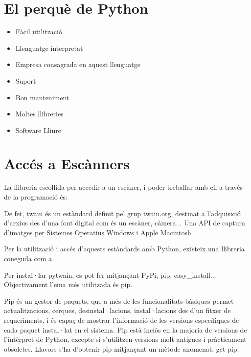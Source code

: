 \documentclass[letterpaper,11pt,catalan]{sphinxmanual}
\begin{document}
\section{El perquè de Python}
\label{\detokenize{index:el-perque-de-python}}\begin{itemize}
\item {} 
Fàcil utilització

\item {} 
Llenguatge interpretat

\item {} 
Empresa consagrada en aquest llenguatge

\item {} 
Suport

\item {} 
Bon manteniment

\item {} 
Moltes llibreries

\item {} 
Software Lliure

\end{itemize}


\section{Accés a Escànners}
\label{\detokenize{index:reference-twain}}\label{\detokenize{index:acces-a-escanners}}
La llibreria escollida per accedir a un escàner, i poder treballar
amb ell a través de la programació és: 

De fet, twain és un estàndard definit pel grup twain.org, destinat a l'adquisició
d'arxius des d'una font digital com és un escàner, càmera... Una API de captura
d'imatges per Sistemes Operatius Windows i Apple Macintosh.

Per la utilització i accés d'aquests estàndards amb Python, existeix una llibreria
coneguda com a 

Per instal·lar pytwain, es pot fer mitjançant PyPi, pip, easy\_install... Objectivament
l'eina més utilitzada és pip.

Pip és un gestor de paquets, que a més de les funcionalitats bàsiques permet actualitzacions,
cerques, desinstal·lacions, instal·lacions des d'un fitxer de requeriments, i és capaç de mostrar
l'informació de les versions específiques de cada paquet instal·lat en el sistema. Pip està inclòs
en la majoria de versions de l'intèrpret de Python, excepte si s'utilitzen versions molt antigues i pràcticament
obsoletes. Llavors s'ha d'obtenir pip mitjançant un mètode anomenat: get-pip.
\end{document}
